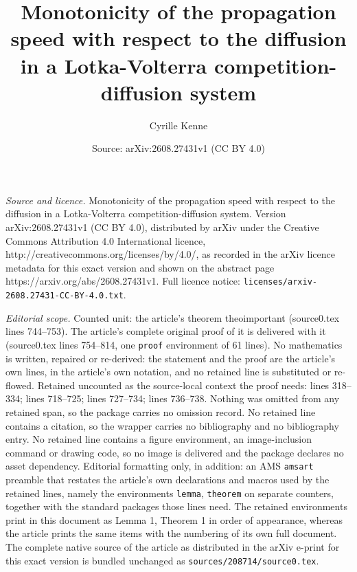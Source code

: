 \documentclass[10pt,a4paper]{amsart}
\title{Monotonicity of the propagation speed with respect to the diffusion in a Lotka-Volterra competition-diffusion system}
\author{Cyrille Kenne}
\date{Source: arXiv:2608.27431v1 (CC BY 4.0)}
\begin{document}
\maketitle

\noindent\emph{Source and licence.} Monotonicity of the propagation speed with respect to the diffusion in a Lotka-Volterra competition-diffusion system. Version arXiv:2608.27431v1 (CC BY 4.0), distributed by arXiv under the Creative Commons Attribution 4.0 International licence, http://creativecommons.org/licenses/by/4.0/, as recorded in the arXiv licence metadata for this exact version and shown on the abstract page https://arxiv.org/abs/2608.27431v1. Full licence notice: \texttt{licenses/arxiv-2608.27431-CC-BY-4.0.txt}.\par\smallskip

\noindent\textit{Editorial scope.} Counted unit: the article's theorem theoimportant (source0.tex lines 744--753). The article's complete original proof of it is delivered with it (source0.tex lines 754--814, one \texttt{proof} environment of 61 lines). No mathematics is written, repaired or re-derived: the statement and the proof are the article's own lines, in the article's own notation, and no retained line is substituted or re-flowed.  Retained uncounted as the source-local context the proof needs: lines 318--334; lines 718--725; lines 727--734; lines 736--738.  Nothing was omitted from any retained span, so the package carries no omission record.  No retained line contains a citation, so the wrapper carries no bibliography and no bibliography entry.  No retained line contains a figure environment, an image-inclusion command or drawing code, so no image is delivered and the package declares no asset dependency.  Editorial formatting only, in addition: an AMS \texttt{amsart} preamble that restates the article's own declarations and macros used by the retained lines, namely the environments \texttt{lemma}, \texttt{theorem} on separate counters, together with the standard packages those lines need.  The retained environments print in this document as Lemma 1, Theorem 1 in order of appearance, whereas the article prints the same items with the numbering of its own full document.  The complete native source of the article as distributed in the arXiv e-print for this exact version is bundled unchanged as \texttt{sources/208714/source0.tex}.
\end{document}
